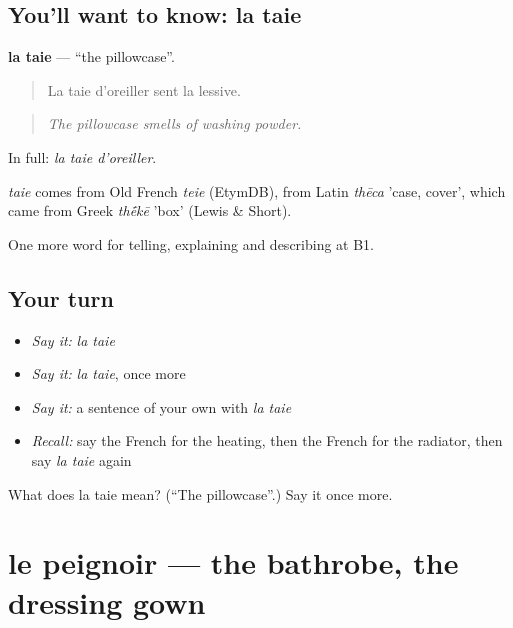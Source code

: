 \subsection*{You'll want to know: la taie}
\textbf{la taie} — \textquotedblleft{}the pillowcase\textquotedblright{}.

\begin{quote}
La taie d'oreiller sent la lessive.
\end{quote}

\begin{quote}
\emph{The pillowcase smells of washing powder.}
\end{quote}

In full: \emph{la taie d'oreiller}.

\begin{cousinweb}
\emph{taie} comes from Old French \emph{teie} (EtymDB), from Latin \emph{thēca} 'case, cover', which came from Greek \emph{th\'{\={e}}kē} 'box' (Lewis \& Short).
\end{cousinweb}

\begin{grammarlens}[title={What you've built}]
One more word for telling, explaining and describing at B1.
\end{grammarlens}

\subsection*{Your turn}
\begin{itemize}
\raggedright
  \item \emph{Say it:} \emph{la taie}
  \item \emph{Say it:} \emph{la taie}, once more
  \item \emph{Say it:} a sentence of your own with \emph{la taie}
  \item \emph{Recall:} say the French for the heating, then the French for the radiator, then say \emph{la taie} again
\end{itemize}

\begin{tcolorbox}[breakable,colback=teal!4,colframe=teal!35!black,title={Before you move on}]
What does la taie mean? (\textquotedblleft{}The pillowcase\textquotedblright{}.) Say it once more.
\end{tcolorbox}
\section[le peignoir]{le peignoir — the bathrobe, the dressing gown}

